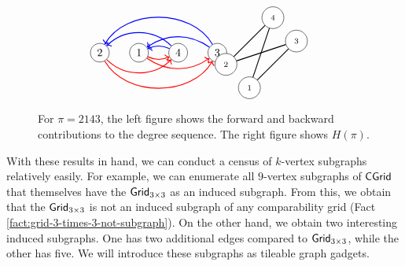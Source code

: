 \begin{figure}[H]
\[
\begin{minipage}{0.3\textwidth}
\centering
\begin{tikzpicture}[
    scale=1.25,
    vertex/.style={circle, draw, inner sep=1.5pt, minimum size=6mm},
    rededge/.style={->, color=red, thick},
    blueedge/.style={->, color=blue, thick}
]
    \node[vertex] (n1) at (0,0) {$2$};
    \node[vertex] (n2) at (1,0) {$1$};
    \node[vertex] (n3) at (2,0) {$4$};
    \node[vertex] (n4) at (3,0) {$3$};

    \draw[rededge] (n1) to[bend right=45] (n3);
    \draw[rededge] (n1) to[bend right=60] (n4);
    \draw[rededge] (n2) to[bend right=25] (n3);
    \draw[rededge] (n2) to[bend right=35] (n4);

    \draw[blueedge] (n3) to[bend right=45] (n1);
    \draw[blueedge] (n3) to[bend right=25] (n2);
    \draw[blueedge] (n4) to[bend right=60] (n1);
    \draw[blueedge] (n4) to[bend right=35] (n2);
\end{tikzpicture}
\end{minipage}
\hfill
\begin{minipage}{0.3\textwidth}
\centering
\begin{tikzpicture}[
    scale=0.75,
    gridline/.style={gray!25, very thin},
    vertex/.style={circle, draw, fill=white, inner sep=1.5pt, minimum size=7mm},
    edge/.style={thick}
]
    \node[vertex] (v1) at (1,2) {\scriptsize \(2\)};
    \node[vertex] (v2) at (2,1) {\scriptsize \(1\)};
    \node[vertex] (v3) at (3,4) {\scriptsize \(4\)};
    \node[vertex] (v4) at (4,3) {\scriptsize \(3\)};

    \draw[edge] (v1) -- (v3);
    \draw[edge] (v1) -- (v4);
    \draw[edge] (v2) -- (v3);
    \draw[edge] (v2) -- (v4);
\end{tikzpicture}
\end{minipage}
\]
\caption{For \(\pi=2143\), the left figure shows the {\color{red}forward} and {\color{blue}backward} contributions to the degree sequence. The right figure shows $H(\pi)$.}
\label{fig:fenwick-tree-example}
\end{figure}

With these results in hand, we can conduct a census of $k$-vertex subgraphs relatively easily. For example, we can enumerate all $9$-vertex subgraphs of $\mathsf{CGrid}$ that themselves have the $\mathsf{Grid}_{3 \times 3}$ as an induced subgraph. From this, we obtain that the $\mathsf{Grid}_{3 \times 3}$ is not an induced subgraph of any comparability grid (Fact \ref{fact:grid-3-times-3-not-subgraph}). On the other hand, we obtain two interesting induced subgraphs. One has two additional edges compared to $\mathsf{Grid}_{3 \times 3}$, while the other has five. We will introduce these subgraphs as tileable graph gadgets.

